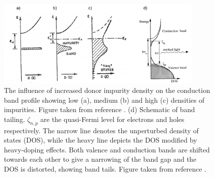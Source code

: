 \documentclass[11pt, twoside]{report}
\begin{document}
\begin{figure}[h!]
  \centering
    \includegraphics[width=0.9\textwidth]{figures/bs2+pankove.png}
    \caption[The influence of increased donor impurity density on the conduction band profile showing low (a), medium (b) and high (c) densities of impurities. (d) Schematic of band tailing. $\zeta_{n,p}$ are the quasi-Fermi level for electrons and holes respectively. The narrow line denotes the unperturbed density of states (DOS), while the heavy line depicts the DOS modified by heavy-doping effects. Both valence and conduction bands are shifted towards each other to give a narrowing of the band gap and the DOS is distorted, showing band tails.]{The influence of increased donor impurity density on the conduction band profile showing low (a), medium (b) and high (c) densities of impurities. Figure taken from reference . (d) Schematic of band tailing. $\zeta_{n,p}$ are the quasi-Fermi level for electrons and holes respectively. The narrow line denotes the unperturbed density of states (DOS), while the heavy line depicts the DOS modified by heavy-doping effects. Both valence and conduction bands are shifted towards each other to give a narrowing of the band gap and the DOS is distorted, showing band tails. Figure taken from reference .}
  \label{bs2}
\end{figure}
\end{document}
